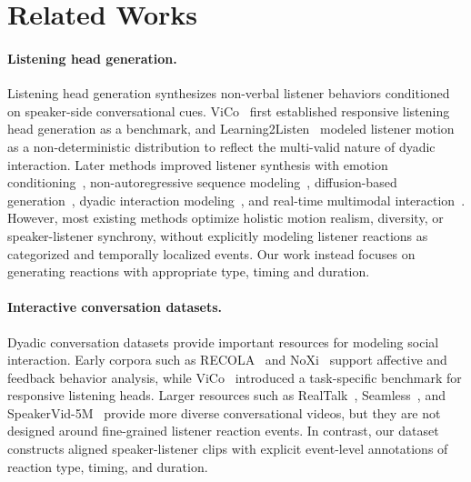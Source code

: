 \section{Related Works}

\paragraph{Listening head generation.}
Listening head generation synthesizes non-verbal listener behaviors conditioned on speaker-side conversational cues. ViCo~\cite{zhou2022responsive} first established responsive listening head generation as a benchmark, and Learning2Listen~\cite{ng2022learning} modeled listener motion as a non-deterministic distribution to reflect the multi-valid nature of dyadic interaction. Later methods improved listener synthesis with emotion conditioning~\cite{song2023emotional}, non-autoregressive sequence modeling~\cite{liu2024listenformer}, diffusion-based generation~\cite{tran2024dim}, dyadic interaction modeling~\cite{wang2025diffusion}, and real-time multimodal interaction~\cite{zhu2025infp,guo2025arig}. However, most existing methods optimize holistic motion realism, diversity, or speaker-listener synchrony, without explicitly modeling listener reactions as categorized and temporally localized events. Our work instead focuses on generating reactions with appropriate type, timing and duration.

\paragraph{Interactive conversation datasets.}
Dyadic conversation datasets provide important resources for modeling social interaction. Early corpora such as RECOLA~\cite{ringeval2013recola} and NoXi~\cite{cafaro2017noxi} support affective and feedback behavior analysis, while ViCo~\cite{zhou2022responsive} introduced a task-specific benchmark for responsive listening heads. Larger resources such as RealTalk~\cite{geng2023realtalk}, Seamless~\cite{agrawal2025seamless}, and SpeakerVid-5M~\cite{zhang2025speakervid5m} provide more diverse conversational videos, but they are not designed around fine-grained listener reaction events. In contrast, our dataset constructs aligned speaker-listener clips with explicit event-level annotations of reaction type, timing, and duration.

